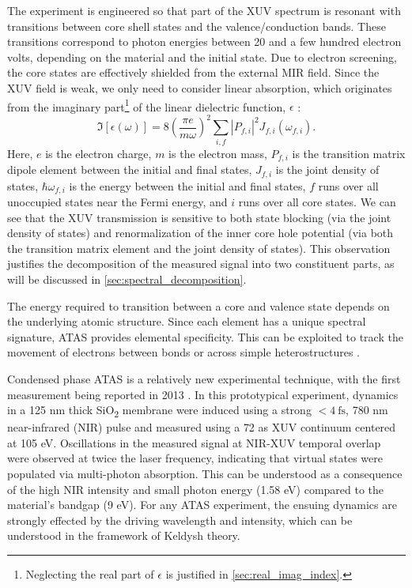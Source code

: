 The experiment is engineered so that part of the XUV spectrum is resonant with transitions between core shell states and the valence/conduction bands. These transitions correspond to photon energies between 20 and a few hundred electron volts, depending on the material and the initial state. Due to electron screening, the core states are effectively shielded from the external MIR field. Since the XUV field is weak, we only need to consider linear absorption, which originates from the imaginary part\footnote{Neglecting the real part of $\epsilon$ is justified in \cref{sec:real_imag_index}.} of the linear dielectric function, $\epsilon$ \cite{kaplanFemtosecondTrackingCarrier2018}:
\begin{equation}
	\label{eqn:imag_linear_dielectric_func}
\Im \left[ \epsilon (\omega) \right] = 8 \left( \frac{\pi e}{m \omega}\right)^2 \sum_{i,f}  \left| P_{f,i} \right|^2 J_{f,i}(\omega_{f,i}).
\end{equation}
Here, $e$ is the electron charge, $m$ is the electron mass, $P_{f,i}$ is the transition matrix dipole element between the initial and final states, $J_{f,i}$ is the joint density of states, $\hbar \omega_{f,i}$ is the energy between the initial and final states, $f$ runs over all unoccupied states near the Fermi energy, and $i$ runs over all core states. We can see that the XUV transmission is sensitive to both state blocking (via the joint density of states) and renormalization of the inner core hole potential (via both the transition matrix element and the joint density of states). This observation justifies the decomposition of the measured signal into two constituent parts, as will be discussed in \cref{sec:spectral_decomposition}.

The energy required to transition between a core and valence state depends on the underlying atomic structure. Since each element has a unique spectral signature, ATAS provides elemental specificity. This can be exploited to track the movement of electrons between bonds or across simple heterostructures \cite{marshUltrafastTimeresolvedExtreme2018,cushingLayerresolvedUltrafastExtreme2020}.

Condensed phase ATAS is a relatively new experimental technique, with the first measurement being reported in 2013 \cite{schultzeControllingDielectricsElectric2013}. In this prototypical experiment, dynamics in a {125 nm} thick SiO\textsubscript{2} membrane were induced using a strong ${<4 \ \textrm{fs}}$, {780 nm} near-infrared (NIR) pulse and measured using a {72 as} XUV continuum centered at {105 eV}. Oscillations in the measured signal at NIR-XUV temporal overlap were observed at twice the laser frequency, indicating that virtual states were populated via multi-photon absorption. This can be understood as a consequence of the high NIR intensity and small photon energy ({1.58 eV}) compared to the material's bandgap ({9 eV}). For any ATAS experiment, the ensuing dynamics are strongly effected by the driving wavelength and intensity, which can be understood in the framework of Keldysh theory.

